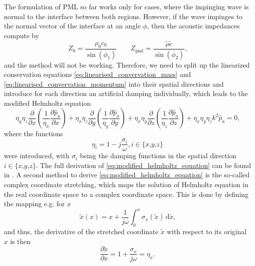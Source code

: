 The formulation of PML so far works only for cases, where the impinging wave is normal to the interface between both regions. However, if the wave impinges to the normal vector of the interface at an angle $\phi$, then the acoustic impedances compute by
\begin{equation}
	Z_{\text{0}} = \frac{\rho_0 c_0}{\sin(\phi_1)}\qquad Z_{\text{pml}} = \frac{\tilde{\rho} \tilde{c}}{\sin(\phi_2)} \text{,}
\end{equation}
and the method will not be working. Therefore, we need to split up the linearized conservation equations \cref{eq:linearised_convervation_mass} and \cref{eq:linearised_convervation_momentum} into their spatial directions and introduce for each direction an artificial damping individually, which leads to the modified Helmholtz equation
\begin{equation}
	\eta_y\eta_z\frac{\partial}{\partial x}\left(\frac{1}{\eta_x}\frac{\partial\hat{p}_a}{\partial x}\right) + \eta_x\eta_z\frac{\partial}{\partial y}\left(\frac{1}{\eta_y}\frac{\partial\hat{p}_a}{\partial y}\right) + \eta_x\eta_y\frac{\partial}{\partial z}\left(\frac{1}{\eta_z}\frac{\partial\hat{p}_a}{\partial z}\right) + \eta_x\eta_y\eta_zk^2\hat{p}_a = 0 \text{,} \label{eq:modified_helmholtz_equation}
\end{equation}
where the functions
\begin{equation}
	\eta_i = 1 - j\frac{\sigma_i}{\omega}\text{,}\,i \in \lbrace x\text{,}y\text{,}z\rbrace
\end{equation}
were introduced, with $\sigma_i$ being the damping functions in the spatial direction $i\in\lbrace x\text{,}y\text{,}z\rbrace$. The full derivation of \cref{eq:modified_helmholtz_equation} can be found in \cite{kaltenbacher_numerical_2007}. A second method to derive \cref{eq:modified_helmholtz_equation} is the so-called complex coordinate stretching, which maps the solution of Helmholtz equation in the real coordinate space to a complex coordinate space. This is done by defining the mapping e.g. for $x$
\begin{equation}
	\tilde{x}(x) = x + \frac{1}{j\omega}\int_{0}^{x} \sigma_x(\tilde{x})\,\text{d}\tilde{x}\text{,}
\end{equation}
and thus, the derivative of the stretched coordinate $\tilde{x}$ with respect to its original $x$ is then
\begin{equation}
	\frac{\partial \tilde{x}}{\partial x} = 1 + \frac{\sigma_x}{j\omega} = \eta_x \text{.} \label{eq:derivative_stretched_coordinate}
\end{equation}
